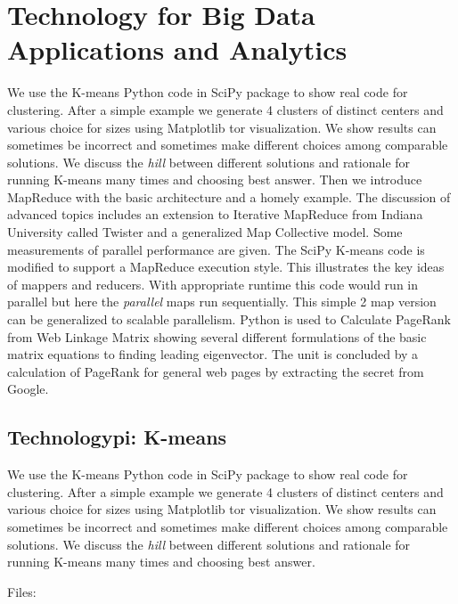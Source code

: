 


\chapter{Technology for Big Data Applications and
Analytics}\label{technology-for-big-data-applications-and-analytics}

\FILENAME

We use the K-means Python code in SciPy package to show real code for
clustering. After a simple example we generate 4 clusters of distinct
centers and various choice for sizes using Matplotlib tor visualization.
We show results can sometimes be incorrect and sometimes make different
choices among comparable solutions. We discuss the \textit{hill} between
different solutions and rationale for running K-means many times and
choosing best answer. Then we introduce MapReduce with the basic
architecture and a homely example. The discussion of advanced topics
includes an extension to Iterative MapReduce from Indiana University
called Twister and a generalized Map Collective model. Some measurements
of parallel performance are given. The SciPy K-means code is modified to
support a MapReduce execution style. This illustrates the key ideas of
mappers and reducers. With appropriate runtime this code would run in
parallel but here the \emph{parallel} maps run sequentially. This simple
2 map version can be generalized to scalable parallelism. Python is used
to Calculate PageRank from Web Linkage Matrix showing several different
formulations of the basic matrix equations to finding leading
eigenvector. The unit is concluded by a calculation of PageRank for
general web pages by extracting the secret from Google.

\section{Technologypi: K-means}\label{technologypi-k-means}

We use the K-means Python code in SciPy package to show real code for
clustering. After a simple example we generate 4 clusters of distinct
centers and various choice for sizes using Matplotlib tor visualization.
We show results can sometimes be incorrect and sometimes make different
choices among comparable solutions. We discuss the \emph{hill} between
different solutions and rationale for running K-means many times and
choosing best answer.

Files:


